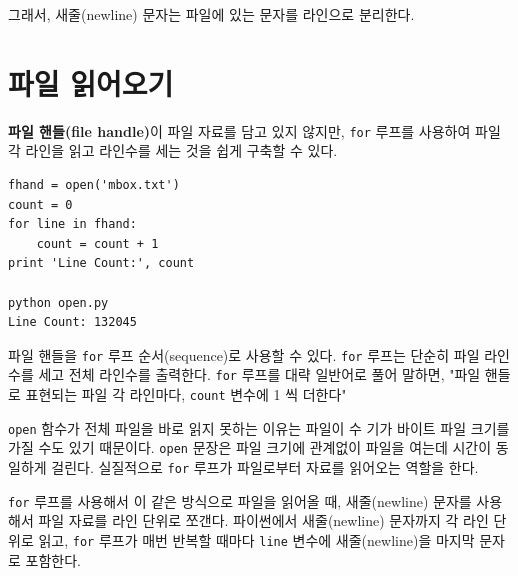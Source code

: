 
그래서, 새줄(newline) 문자는 파일에 있는 문자를 라인으로 분리한다.


\section{파일 읽어오기}


{\bf 파일 핸들(file handle)}이 파일 자료를 담고 있지 않지만, 
{\tt for} 루프를 사용하여 파일 각 라인을 읽고 라인수를 세는 것을 쉽게 구축할 수 있다.

\beforeverb
\begin{verbatim}
fhand = open('mbox.txt')
count = 0
for line in fhand:
    count = count + 1
print 'Line Count:', count

python open.py 
Line Count: 132045
\end{verbatim}
\afterverb
%

파일 핸들을 {\tt for} 루프 순서(sequence)로 사용할 수 있다. 
{\tt for} 루프는 단순히 파일 라인 수를 세고 전체 라인수를 출력한다.
{\tt for} 루프를 대략 일반어로 풀어 말하면, "파일 핸들로 표현되는 파일 각 라인마다, {\tt count} 변수에 1 씩 더한다"

{\tt open} 함수가 전체 파일을 바로 읽지 못하는 이유는 파일이 수 기가 바이트 파일 크기를 가질 수도 있기 때문이다.
{\tt open} 문장은 파일 크기에 관계없이 파일을 여는데 시간이 동일하게 걸린다. 
실질적으로 {\tt for} 루프가 파일로부터 자료를 읽어오는 역할을 한다.

{\tt for} 루프를 사용해서 이 같은 방식으로 파일을 읽어올 때, 새줄(newline) 문자를 사용해서 파일 자료를 라인 단위로 쪼갠다.
파이썬에서 새줄(newline) 문자까지 각 라인 단위로 읽고, 
{\tt for} 루프가 매번 반복할 때마다 {\tt line} 변수에 새줄(newline)을 마지막 문자로 포함한다.

